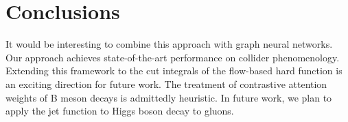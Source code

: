 \section{Conclusions}\label{sec:conclusions}

It would be interesting to combine this approach with graph neural
networks. Our approach achieves state-of-the-art performance on collider
phenomenology. Extending this framework to the cut integrals of the
flow-based hard function is an exciting direction for future work. The
treatment of contrastive attention weights of B meson decays is
admittedly heuristic. In future work, we plan to apply the jet function
to Higgs boson decay to gluons.

